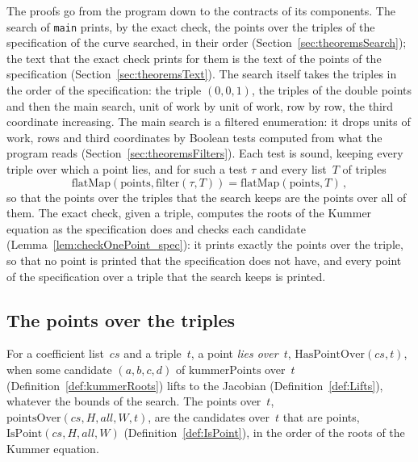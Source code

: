 The proofs go from the program down to the contracts of its components. The search of
\texttt{main} prints, by the exact check, the points over the triples of the specification of the
curve searched, in their order (Section~\ref{sec:theoremsSearch}); the text that the exact check
prints for them is the text of the points of the specification (Section~\ref{sec:theoremsText}).
The search itself takes the triples in the order of the specification: the triple $(0, 0, 1)$, the
triples of the double points and then the main search, unit of work by unit of work, row by row,
the third coordinate increasing. The main search is a filtered enumeration: it drops units of work,
rows and third coordinates by Boolean tests computed from what the program reads
(Section~\ref{sec:theoremsFilters}). Each test is sound, keeping every triple over which a point
lies, and for such a test $\tau$ and every list~$T$ of triples
\[ \mathrm{flatMap}(\mathrm{points}, \mathrm{filter}(\tau, T)) = \mathrm{flatMap}(\mathrm{points},
   T)\,, \]
so that the points over the triples that the search keeps are the points over all of them. The
exact check, given a triple, computes the roots of the Kummer equation as the specification does
and checks each candidate (Lemma~\ref{lem:checkOnePoint_spec}): it prints exactly the points over
the triple, so that no point is printed that the specification does not have, and every point of
the specification over a triple that the search keeps is printed.

\subsection{The points over the triples}\label{sec:theoremsReference}

\begin{definition}\label{def:HasPointOver}
  \leanok
  For a coefficient list~$\mathit{cs}$ and a triple~$t$, a point \emph{lies over}~$t$,
  $\mathrm{HasPointOver}(\mathit{cs}, t)$, when some candidate $(a, b, c, d)$ of
  $\mathrm{kummerPoints}$ over~$t$ (Definition~\ref{def:kummerRoots}) lifts to the Jacobian
  (Definition~\ref{def:Lifts}), whatever the bounds of the search. The points over~$t$,
  $\mathrm{pointsOver}(\mathit{cs}, H, \mathit{all}, W, t)$, are the candidates over~$t$ that are
  points, $\mathrm{IsPoint}(\mathit{cs}, H, \mathit{all}, W)$ (Definition~\ref{def:IsPoint}), in the
  order of the roots of the Kummer equation.
\end{definition}

